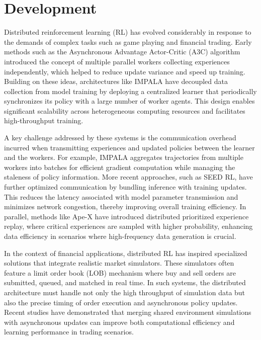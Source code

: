 

\chapter{Development}
\label{ch:development}

Distributed reinforcement learning (RL) has evolved considerably in response to the demands of complex tasks such as game playing and financial trading.
Early methods such as the Asynchronous Advantage Actor-Critic (A3C)
algorithm introduced the concept of multiple parallel workers collecting experiences independently,
which helped to reduce update variance and speed up training.
Building on these ideas, architectures like IMPALA have decoupled data collection from model training by deploying a
centralized learner that periodically synchronizes its policy with a large number of worker agents.
This design enables significant scalability across heterogeneous computing resources and facilitates high-throughput training.

A key challenge addressed by these systems is the communication overhead incurred when transmitting experiences and
updated policies between the learner and the workers.
For example, IMPALA aggregates trajectories from multiple workers into
batches for efficient gradient computation while managing the staleness of policy information.
More recent approaches, such as SEED RL, have further optimized communication by bundling inference with training updates.
This reduces the latency associated with model parameter transmission and minimizes network congestion, thereby improving overall training efficiency.
In parallel, methods like Ape-X have introduced distributed prioritized experience replay, where critical experiences are sampled with higher probability,
enhancing data efficiency in scenarios where high-frequency data generation is crucial.

In the context of financial applications, distributed RL has inspired specialized solutions that integrate realistic market simulators.
These simulators often feature a limit order book (LOB) mechanism where buy and sell orders are submitted, queued, and matched in real time.
In such systems, the distributed architecture must handle not only the high throughput of simulation data but also the
precise timing of order execution and asynchronous policy updates.
Recent studies have demonstrated that merging shared environment simulations with asynchronous updates can improve both
computational efficiency and learning performance in trading scenarios.

